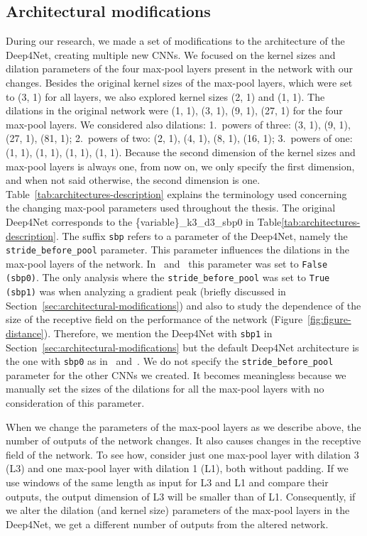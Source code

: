 \subsection{Architectural modifications}\label{subsec:architectural-modifications}
During our research, we made a set of modifications to the architecture of the Deep4Net, creating multiple new CNNs.
We focused on the kernel sizes and dilation parameters of the four max-pool layers present in the network with our changes.
Besides the original kernel sizes of the max-pool layers, which were set to (3, 1) for all layers, we also explored kernel sizes (2, 1) and (1, 1).
The dilations in the original network were (1, 1), (3, 1), (9, 1), (27, 1) for the four max-pool layers. We considered also dilations: 1.~powers of three: (3, 1), (9, 1), (27, 1), (81, 1); 2.~powers of two: (2, 1), (4, 1), (8, 1), (16, 1); 3.~powers of one: (1, 1), (1, 1), (1, 1), (1, 1). Because the second dimension of the kernel sizes and max-pool layers is always one, from now on, we only specify the first dimension, and when not said otherwise, the second dimension is one.
Table~\ref{tab:architectures-description} explains the terminology used concerning the changing max-pool parameters used throughout the thesis.
The original Deep4Net corresponds to the \{variable\}\_k3\_d3\_sbp0 in Table\ref{tab:architectures-description}.
The suffix \texttt{sbp} refers to a parameter of the Deep4Net, namely the \texttt{stride\_before\_pool} parameter.
This parameter influences the dilations in the max-pool layers of the network.
In~\cite{Hammer-2021} and~\cite{schirrmeister-deep-2017} this parameter was set to \texttt{False (sbp0)}.
The only analysis where the \texttt{stride\_before\_pool} was set to \texttt{True (sbp1)} was when analyzing a gradient peak (briefly discussed in Section~\ref{sec:architectural-modifications}) and also to study the dependence of the size of the receptive field on the performance of the network (Figure~\ref{fig:figure-distance}). 
Therefore, we mention the Deep4Net with \texttt{sbp1} in Section~\ref{sec:architectural-modifications} but the default Deep4Net architecture is the one with \texttt{sbp0} as in~\cite{Hammer-2021} and~\cite{schirrmeister-deep-2017}.
We do not specify the \texttt{stride\_before\_pool} parameter for the other CNNs we created. It becomes meaningless because we manually set the sizes of the dilations for all the max-pool layers with no consideration of this parameter.

When we change the parameters of the max-pool layers as we describe above, the number of outputs of the network changes.
It also causes changes in the receptive field of the network.
To see how, consider just one max-pool layer with dilation 3 (L3) and one max-pool layer with dilation 1 (L1), both without padding.
If we use windows of the same length as input for L3 and L1 and compare their outputs, the output dimension of L3 will be smaller than of L1.
Consequently, if we alter the dilation (and kernel size) parameters of the max-pool layers in the Deep4Net, we get a different number of outputs from the altered network.

